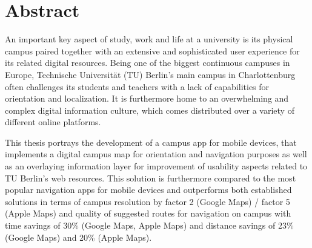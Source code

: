 \chapter*{Abstract}
\label{cha:abstract}

An important key aspect of study, work and life at a university is its physical campus paired together with an extensive and sophisticated user experience for its related digital resources. 
Being one of the biggest continuous campuses in Europe, Technische Universität (TU) Berlin's main campus in Charlottenburg often challenges its students and teachers with a lack of capabilities for orientation and localization. It is furthermore home to an overwhelming and complex digital information culture, which comes distributed over a variety of different online platforms.

This thesis portrays the development of a campus app for mobile devices, that implements a digital campus map for orientation and navigation purposes as well as an overlaying information layer for improvement of usability aspects related to TU Berlin's web resources. This solution is furthermore compared to the most popular navigation apps for mobile devices and outperforms both established solutions in terms of campus resolution by factor 2 (Google Maps) / factor 5 (Apple Maps) and quality of suggested routes for navigation on campus with time savings of 30\% (Google Maps, Apple Maps) and distance savings of 23\% (Google Maps) and 20\% (Apple Maps).